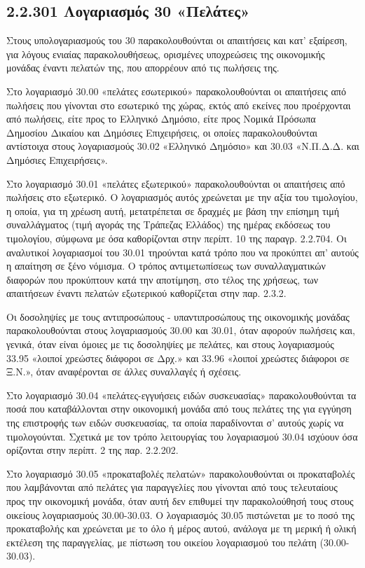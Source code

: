 \documentclass[A4,10pt,greek]{book}
\begin{document}
\subsection{2.2.301 Λογαριασμός 30 «Πελάτες»}

Στους υπολογαριασμούς του 30 παρακολουθούνται οι απαιτήσεις και κατ' εξαίρεση, για λόγους ενιαίας παρακολουθήσεως, ορισμένες υποχρεώσεις της οικονομικής μονάδας έναντι πελατών της, που απορρέουν από τις πωλήσεις της.

Στο λογαριασμό 30.00 «πελάτες εσωτερικού» παρακολουθούνται οι απαιτήσεις από πωλήσεις που γίνονται στο εσωτερικό της χώρας, εκτός από εκείνες που προέρχονται από πωλήσεις, είτε προς το Ελληνικό Δημόσιο, είτε προς Νομικά Πρόσωπα Δημοσίου Δικαίου και Δημόσιες Επιχειρήσεις, οι οποίες παρακολουθούνται αντίστοιχα στους λογαριασμούς 30.02 «Ελληνικό Δημόσιο» και 30.03 «Ν.Π.Δ.Δ. και Δημόσιες Επιχειρήσεις».

Στο λογαριασμό 30.01 «πελάτες εξωτερικού» παρακολουθούνται οι απαιτήσεις από πωλήσεις στο εξωτερικό. Ο λογαριασμός αυτός χρεώνεται με την αξία του τιμολογίου, η οποία, για τη χρέωση αυτή, μετατρέπεται σε δραχμές με βάση την επίσημη τιμή συναλλάγματος (τιμή αγοράς της Τράπεζας Ελλάδος) της ημέρας εκδόσεως του τιμολογίου, σύμφωνα με όσα καθορίζονται στην περίπτ. 10 της παραγρ. 2.2.704. Οι αναλυτικοί λογαριασμοί του 30.01 τηρούνται κατά τρόπο που να προκύπτει απ' αυτούς η απαίτηση σε ξένο νόμισμα. Ο τρόπος αντιμετωπίσεως των συναλλαγματικών διαφορών που προκύπτουν κατά την αποτίμηση, στο τέλος της χρήσεως, των απαιτήσεων έναντι πελατών εξωτερικού καθορίζεται στην παρ. 2.3.2.

Οι δοσοληψίες με τους αντιπροσώπους - υπαντιπροσώπους της οικονομικής μονάδας παρακολουθούνται στους λογαριασμούς 30.00 και 30.01, όταν αφορούν πωλήσεις και, γενικά, όταν είναι όμοιες με τις δοσοληψίες με πελάτες, και στους λογαριασμούς 33.95 «λοιποί χρεώστες διάφοροι σε Δρχ.» και 33.96 «λοιποί χρεώστες διάφοροι σε Ξ.Ν.», όταν αναφέρονται σε άλλες συναλλαγές ή σχέσεις.

Στο λογαριασμό 30.04 «πελάτες-εγγυήσεις ειδών συσκευασίας» παρακολουθούνται τα ποσά που καταβάλλονται στην οικονομική μονάδα από τους πελάτες της για εγγύηση της επιστροφής των ειδών συσκευασίας, τα οποία παραδίνονται σ' αυτούς χωρίς να τιμολογούνται. Σχετικά με τον τρόπο λειτουργίας του λογαριασμού 30.04 ισχύουν όσα ορίζονται στην περίπτ. 2 της παρ. 2.2.202.

Στο λογαριασμό 30.05 «προκαταβολές πελατών» παρακολουθούνται οι προκαταβολές που λαμβάνονται από πελάτες για παραγγελίες που γίνονται από τους τελευταίους προς την οικονομική μονάδα, όταν αυτή δεν επιθυμεί την παρακολούθησή τους στους οικείους λογαριασμούς 30.00-30.03. Ο λογαριασμός 30.05 πιστώνεται με το ποσό της προκαταβολής και χρεώνεται με το όλο ή μέρος αυτού, ανάλογα με τη μερική ή ολική εκτέλεση της παραγγελίας, με πίστωση του οικείου λογαριασμού του πελάτη (30.00-30.03).
\end{document}
